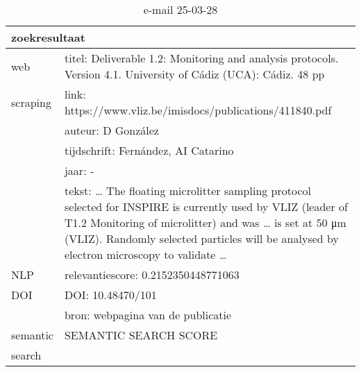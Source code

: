 \begin{table}[h!]
    \caption{e-mail 25-03-28}
    \centering
    \begin{tabularx}{\textwidth}{|p{4cm}|X|} 
        \hline
        \multicolumn{2}{|X|}{\textbf{zoekresultaat}} \\
        \hline
        web &titel: Deliverable 1.2: Monitoring and analysis protocols. Version 4.1. University of Cádiz (UCA): Cádiz. 48 pp\\
        scraping&link: https://www.vliz.be/imisdocs/publications/411840.pdf\\
        &auteur: D González\\
        &tijdschrift: Fernández, AI Catarino\\
        &jaar: -\\
        &tekst: … The floating microlitter sampling protocol selected for INSPIRE is currently used by VLIZ (leader of T1.2 Monitoring of microlitter) and was … is set at 50 μm (VLIZ). Randomly selected particles will be analysed by electron microscopy to validate …\\
        \hline
        NLP&relevantiescore: 0.2152350448771063\\
        \hline
        DOI&DOI: 10.48470/101\\
        &bron: webpagina van de publicatie\\
        \hline
        semantic&SEMANTIC SEARCH SCORE\\
        search&\\
        \hline
    \end{tabularx}
    \label{table:email20250328}
\end{table}
